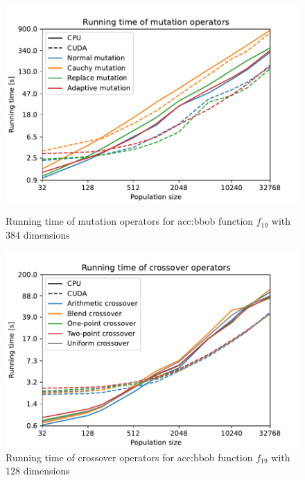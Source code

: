 \begin{figure}
    \begin{minipage}[t]{0.48\textwidth}
        \includegraphics[width=\textwidth]{img/runs/time_es_mutation_with_legend.pdf}
        \caption[Running time of mutation operators]{Running time of mutation operators for \acrshort{acc:bbob} function $f_{19}$ with $384$ dimensions}
        \label{fig:esmuttime}
    \end{minipage}
    \hfill
    \begin{minipage}[t]{0.48\textwidth}
        \includegraphics[width=\textwidth]{img/runs/time_es_crossover_with_legend.pdf}
        \caption[Running time of crossover operators]{Running time of crossover operators for \acrshort{acc:bbob} function $f_{19}$ with $128$ dimensions}
    \end{minipage}
\end{figure}

